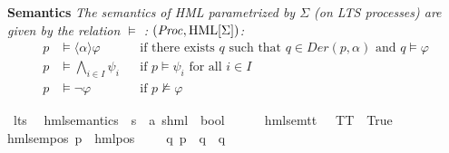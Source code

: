 \begin{isabellebody}
\begin{isamarkuptext}
\textbf{Semantics} \textit{The \textnormal{semantics of HML} parametrized by $\Sigma$ (on LTS processes) are given by the relation $\models$ : $(\mathit{Proc}, \text{HML}[\Sigma])$:}
\begin{align*}
  p &\models \langle \alpha \rangle\varphi && \text{if there exists } q \text{ such that } q\in\mathit{Der}(p, \alpha) \text{ and } q \models\varphi \\
  p &\models \bigwedge_{i \in I} \psi_i && \text{if } p\models\psi_i \text{ for all } i\in I \\
  p &\models \lnot\varphi && \text{if } p\not\models\varphi
\end{align*}%
\end{isamarkuptext}\isamarkuptrue%
\isamarkupfalse%
\ lts\ \isanewline
\isanewline
{}\isamarkupfalse%
\ hml{\isacharunderscore}{\kern0pt}semantics\ {\isacharcolon}{\kern0pt}{\isacharcolon}{\kern0pt}\ {\isacartoucheopen}{\isacharprime}{\kern0pt}s\ {\isasymRightarrow}\ {\isacharparenleft}{\kern0pt}{\isacharprime}{\kern0pt}a{\isacharcomma}{\kern0pt}\ {\isacharprime}{\kern0pt}s{\isacharparenright}{\kern0pt}hml\ {\isasymRightarrow}\ bool{\isacartoucheclose}\isanewline
{\isacharparenleft}{\kern0pt}{\isacartoucheopen}{\isacharunderscore}{\kern0pt}\ {\isasymTurnstile}\ {\isacharunderscore}{\kern0pt}{\isacartoucheclose}\ {\isacharbrackleft}{\kern0pt}{}{}{\isacharcomma}{\kern0pt}\ {}{}{\isacharbrackright}{\kern0pt}\ {}{}{\isacharparenright}{\kern0pt}\isanewline
{}\isanewline
hml{\isacharunderscore}{\kern0pt}sem{\isacharunderscore}{\kern0pt}tt{\isacharcolon}{\kern0pt}\ {\isacartoucheopen}{\isacharparenleft}{\kern0pt}{\isacharunderscore}{\kern0pt}\ {\isasymTurnstile}\ TT{\isacharparenright}{\kern0pt}\ {\isacharequal}{\kern0pt}\ True{\isacartoucheclose}\ {\isacharbar}{\kern0pt}\isanewline
hml{\isacharunderscore}{\kern0pt}sem{\isacharunderscore}{\kern0pt}pos{\isacharcolon}{\kern0pt}\ {\isacartoucheopen}{\isacharparenleft}{\kern0pt}p\ {\isasymTurnstile}\ {\isacharparenleft}{\kern0pt}hml{\isacharunderscore}{\kern0pt}pos\ {\isasymalpha}\ {\isasymphi}{\isacharparenright}{\kern0pt}{\isacharparenright}{\kern0pt}\ {\isacharequal}{\kern0pt}\ {\isacharparenleft}{\kern0pt}{\isasymexists}\ q{\isachardot}{\kern0pt}\ {\isacharparenleft}{\kern0pt}p\ {\isasymmapsto}{\isasymalpha}\ q{\isacharparenright}{\kern0pt}\ {\isasymand}\ q\ {\isasymTurnstile}\ {\isasymphi}{\isacharparenright}{\kern0pt}{\isacartoucheclose}\ {\isacharbar}{\kern0pt}\isanewline

\end{isabellebody}
